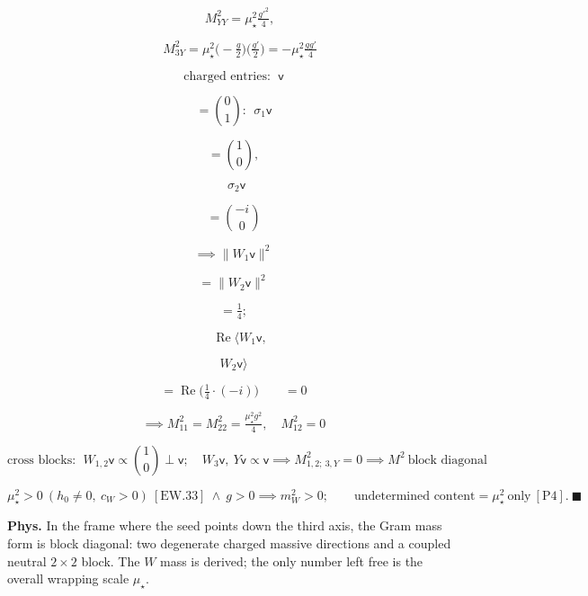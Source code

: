 \begin{theorem}
\[
\quad M^2_{YY}=\mu_\star^2\tfrac{g'^2}4,
\]

\[
\quad M^2_{3Y}=\mu_\star^2\bigl(-\tfrac g2\bigr)\bigl(\tfrac{g'}2\bigr)=-\mu_\star^2\tfrac{gg'}4
\]

\[
\text{charged entries}:\ \ \mathsf v
\]

\[
= \binom01:\ \ \sigma_1\mathsf v
\]

\[
= \binom10,
\]

\[
\ \ \sigma_2\mathsf v
\]

\[
= \binom{-i}0
\]

\[
\implies \|W_1\mathsf v\|^2
\]

\[
= \|W_2\mathsf v\|^2
\]

\[
= \tfrac14;
\]

\[
\quad\operatorname{Re}\langle W_1\mathsf v,
\]

\[
W_2\mathsf v\rangle
\]

\[
= \operatorname{Re}\bigl(\tfrac14\cdot(-i)\bigr)\qquad = 0
\]

\[
\implies M^2_{11}=M^2_{22}=\tfrac{\mu_\star^2g^2}4,\quad M^2_{12}=0
\]

\[
\text{cross blocks}:\ \ W_{1,2}\mathsf v\propto\binom10\perp\mathsf v;\quad W_3\mathsf v,\ Y\mathsf v\propto\mathsf v\implies M^2_{1,2;\ 3,Y}=0\implies M^2\ \text{block diagonal}
\]

\[
\mu_\star^2>0\ (h_0\ne0,\ c_W>0)\ [\mathrm{EW.33}]\ \wedge\ g>0\implies m_W^2>0;\qquad
\text{undetermined content}=\mu_\star^2\ \text{only}\ [\mathrm{P4}].\ \blacksquare
\]

\textbf{Phys.} In the frame where the seed points down the third axis, the Gram mass form is block diagonal: two degenerate charged massive directions and a coupled neutral $2\times2$ block. The $W$ mass is derived; the only number left free is the overall wrapping scale $\mu_\star$.

\end{theorem}

